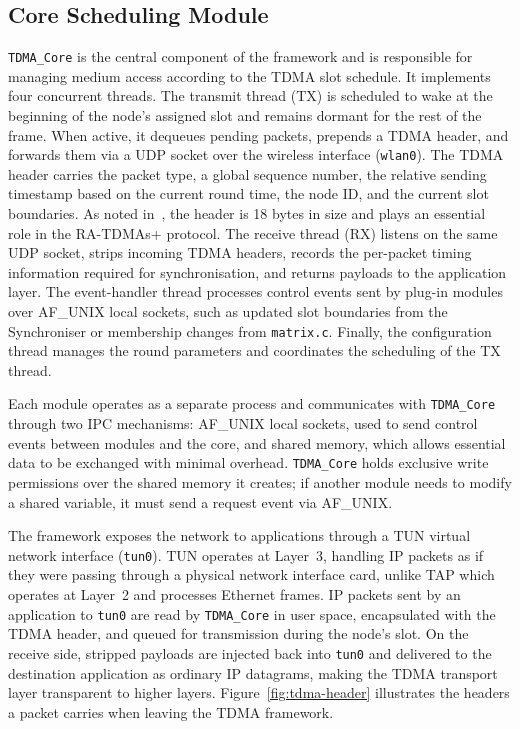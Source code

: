\subsection{Core Scheduling Module}

\texttt{TDMA\_Core} is the central component of the framework and is responsible for managing
medium access according to the TDMA slot schedule. It implements four concurrent threads.
The transmit thread (TX) is scheduled to wake at the beginning of the node's assigned slot and
remains dormant for the rest of the frame. When active, it dequeues pending packets, prepends
a TDMA header, and forwards them via a UDP socket over the wireless interface (\texttt{wlan0}).
The TDMA header carries the packet type, a global sequence number, the relative sending
timestamp based on the current round time, the node ID, and the current slot boundaries. As
noted in~\cite{almeida2023synchronization}, the header is 18 bytes in size and plays an essential
role in the RA-TDMAs+ protocol. The receive thread (RX) listens on the same UDP socket,
strips incoming TDMA headers, records the per-packet timing information required for
synchronisation, and returns payloads to the application layer. The event-handler thread
processes control events sent by plug-in modules over AF\_UNIX local sockets, such as updated
slot boundaries from the Synchroniser or membership changes from \texttt{matrix.c}. Finally,
the configuration thread manages the round parameters and coordinates the scheduling of the TX
thread.

Each module operates as a separate process and communicates with \texttt{TDMA\_Core} through
two IPC mechanisms: AF\_UNIX local sockets, used to send control events between modules and
the core, and shared memory, which allows essential data to be exchanged with minimal overhead.
\texttt{TDMA\_Core} holds exclusive write permissions over the shared memory it creates; if
another module needs to modify a shared variable, it must send a request event via AF\_UNIX.

The framework exposes the network to applications through a TUN virtual network interface
(\texttt{tun0}). TUN operates at Layer~3, handling IP packets as if they were passing through a
physical network interface card, unlike TAP which operates at Layer~2 and processes Ethernet
frames. IP packets sent by an application to \texttt{tun0} are read by \texttt{TDMA\_Core} in
user space, encapsulated with the TDMA header, and queued for transmission during the node's
slot. On the receive side, stripped payloads are injected back into \texttt{tun0} and delivered
to the destination application as ordinary IP datagrams, making the TDMA transport layer
transparent to higher layers. Figure~\ref{fig:tdma-header} illustrates the headers a packet
carries when leaving the TDMA framework.

